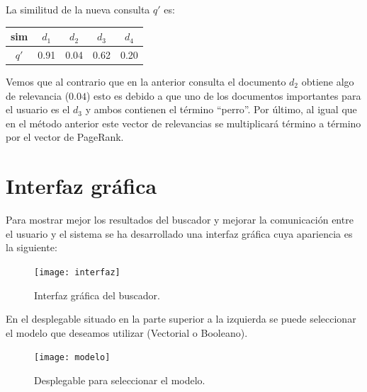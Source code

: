 \documentclass[size=a4, parskip=half, titlepage=false, toc=flat, toc=bib, 12pt]{scrartcl}
\theoremstyle{theorem-style}
\theoremstyle{definition-style}
\theoremstyle{remark-style}
\theoremstyle{example-style}
\theoremstyle{definition-style}
\theoremstyle{remark-style}
\begin{document}
La similitud de la nueva consulta $q'$ es:
\begin{table}[H]
\centering
\begin{tabular}{|c|c|c|c|c|}
\hline
sim  & $d_1$ & $d_2$ & $d_3$ & $d_4$ \\ \hline
$q'$ & 0.91  & 0.04  & 0.62  & 0.20  \\ \hline
\end{tabular}
\end{table}
Vemos que al contrario que en la anterior consulta el documento $d_2$ obtiene algo de relevancia ($0.04$) esto es debido a que uno de los documentos importantes para el usuario es el $d_3$ y ambos contienen el término ``perro''.
Por último, al igual que en el método anterior este vector de relevancias se multiplicará término a término por el vector de PageRank.

\newpage

\section{Interfaz gráfica}
Para mostrar mejor los resultados del buscador y mejorar la comunicación entre el usuario y el sistema se ha desarrollado una interfaz gráfica cuya apariencia es la siguiente:

\begin{figure}[H]
\centering
\texttt{[image: interfaz]}
\caption{Interfaz gráfica del buscador.}
\end{figure}

En el desplegable situado en la parte superior a la izquierda se puede seleccionar el modelo que deseamos utilizar (Vectorial o Booleano).

\begin{figure}[H]
\centering
\texttt{[image: modelo]}
\caption{Desplegable para seleccionar el modelo.}
\end{figure}
\end{document}
